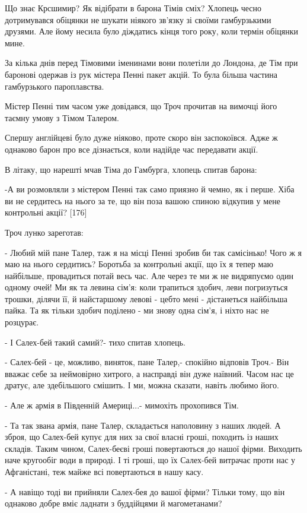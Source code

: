 Що знає Крсшимир? Як відібрати в барона Тімів сміх? Хлопець чесно дотримувався обіцянки не шукати ніякого зв'язку зі своїми гамбурзькими друзями. Але йому несила було діждатись кінця того року, коли термін обіцянки мине.

За кілька днів перед Тімовими іменинами вони полетіли до Лондона, де Тім при баронові одержав із рук містера Пенні пакет акцій. То була більша частина гамбурзького пароплавства.

Містер Пенні тим часом уже довідався, що Троч прочитав на вимочці його таємну умову з Тімом Талером.

Спершу англійцеві було дуже ніяково, проте скоро він заспокоївся. Адже ж однаково барон про все дізнається, коли надійде час передавати акції.

В літаку, що нарешті мчав Тіма до Гамбурга, хлопець спитав барона:

-А ви розмовляли з містером Пенні так само приязно й чемно, як і перше. Хіба ви не сердитесь на нього за те, що він поза вашою спиною відкупив у мене контрольні акції? [176]

Троч лунко зареготав:

- Любий мій пане Талер, таж я на місці Пенні зробив би так самісінько! Чого ж я маю на нього сердитись? Боротьба за контрольні акції, що їх я тепер маю найбільше, провадиться потай весь час. Але через те ми ж не видряпуємо один одному очей! Ми як та левина сім'я: коли трапиться здобич, леви погризуться трошки, ділячи її, й найстаршому левові - цебто мені - дістанеться найбільша пайка. Та як тільки здобич поділено - ми знову одна сім'я, і ніхто нас не розцурає.

- І Салех-бей такий самий?- тихо спитав хлопець.

- Салех-бей - це, можливо, виняток, пане Талер,- спокійно відповів Троч.- Він вважає себе за неймовірно хитрого, а насправді він дуже наївний. Часом нас це дратує, але здебільшого смішить. І ми, можна сказати, навіть любимо його.

- Але ж армія в Південній Америці...- мимохіть прохопився Тім.

- Та так звана армія, пане Талер, складається наполовину з наших людей. А зброя, що Салех-бей купує для них за свої власні гроші, походить із наших складів. Таким чином, Салех-беєві гроші повертаються до нашої фірми. Виходить наче кругообіг води в природі. І ті гроші, що їх Салех-бей витрачає проти нас у Афганістані, теж майже всі повертаються в нашу касу.

- А навіщо тоді ви прийняли Салех-бея до вашої фірми? Тільки тому, що він однаково добре вміє ладнати з буддійцями й магометанами?

